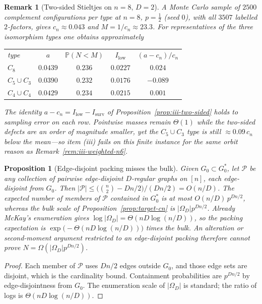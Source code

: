 \documentclass[11pt]{article}
\newtheorem{proposition}[theorem]{Proposition}
\newtheorem{remark}[theorem]{Remark}
\newcommand{\PP}{\mathbb{P}}
\begin{document}
\begin{remark}[Two-sided Stieltjes on \(n=8\), \(D=2\)]
\label{rem:iii-weighted-n8}
A Monte Carlo sample of \(2500\) complement configurations per type at
\(n=8\), \(p=\tfrac12\) (seed \(0\)), with all \(3507\) labelled \(2\)-factors,
gives \(c_n\approx 0.043\) and \(M=1/c_n\approx 23.3\). For representatives of the
three isomorphism types one obtains approximately
\begin{center}
\begin{tabular}{lcccc}
type & \(a\) & \(\PP(N<M)\) & \(I_{\mathrm{low}}\) & \((a-c_n)/c_n\) \\
\(C_8\) & \(0.0439\) & \(0.236\) & \(0.0227\) & \(0.024\) \\
\(C_5\cup C_3\) & \(0.0390\) & \(0.232\) & \(0.0176\) & \(-0.089\) \\
\(C_4\cup C_4\) & \(0.0429\) & \(0.234\) & \(0.0215\) & \(0.001\) \\
\end{tabular}
\end{center}
The identity \(a-c_n=I_{\mathrm{low}}-I_{\mathrm{surv}}\) of
Proposition~\ref{prop:iii-two-sided} holds to sampling error on each row.
Pointwise masses remain \(\Theta(1)\) while the two-sided defects are an order
of magnitude smaller, yet the \(C_5\cup C_3\) type is still
\(\approx 0.09\,c_n\) below the mean---so item (iii) fails on this finite
instance for the same orbit reason as Remark~\ref{rem:iii-weighted-n6}.
\end{remark}

\begin{proposition}[Edge-disjoint packing misses the bulk]
\label{prop:packing-miss}
Given \(G_0\subset G^*_0\), let \(\mathcal P\) be any collection of pairwise
edge-disjoint \(D\)-regular graphs on \([n]\), each edge-disjoint from \(G_0\).
Then \(\lvert\mathcal P\rvert\le\bigl(\binom{n}{2}-Dn/2\bigr)/(Dn/2)=O(n/D)\).
The expected number of members of \(\mathcal P\) contained in \(G^*_0\) is at most
\(O(n/D)\,p^{Dn/2}\), whereas the bulk scale of Proposition~\ref{prop:target-cn}
is \(\lvert\Omega_D\rvert p^{Dn/2}\).
Already McKay's enumeration gives \(\log\lvert\Omega_D\rvert=\Theta(nD\log(n/D))\), so
the packing expectation is \(\exp\bigl(-\Theta(nD\log(n/D))\bigr)\) times the bulk.
An alteration or second-moment argument restricted to an edge-disjoint packing
therefore cannot prove \(N=\Omega(\lvert\Omega_D\rvert p^{Dn/2})\).
\end{proposition}

\begin{proof}
Each member of \(\mathcal P\) uses \(Dn/2\) edges outside \(G_0\), and those edge
sets are disjoint, which is the cardinality bound.
Containment probabilities are \(p^{Dn/2}\) by edge-disjointness from \(G_0\).
The enumeration scale of \(\lvert\Omega_D\rvert\) is standard; the ratio of logs is
\(\Theta(nD\log(n/D))\).
\end{proof}
\end{document}
